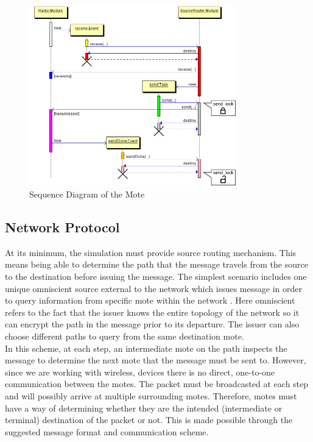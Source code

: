 \documentclass[11pt, titlepage, oneside]{article}
\begin{document}
\begin{figure}[h] 
  \centering 
      \includegraphics[width=0.8\textwidth]{concurrency.png} 
  \caption{Sequence Diagram of the Mote} 
\label{fig:cncr} 
\end{figure} 
 
\subsection{Network Protocol} \label{ntwprtc}
At its minimum, the simulation must provide source routing mechanism. This means being able to determine the path that the message travels from the source to the destination before issuing the message. The simplest scenario includes one unique omniscient source external to the network which issues message in order to query information from specific mote within the network . Here omniscient refers to the fact that the issuer knows the entire topology of the network so it can encrypt the path in the message prior to its departure. The issuer can also choose different paths to query from the same destination mote.  \\

In this scheme, at each step, an intermediate mote on the path inspects the message to determine the next mote that the message must be sent to. However, since we are working with wireless, devices there is no direct, one-to-one communication between the motes. The packet must be broadcasted at each step and will possibly arrive at multiple surrounding motes. Therefore, motes must have a way of determining whether they are the intended (intermediate or terminal) destination of the packet or not. This is made possible through the suggested message format and communication scheme. 
\end{document}
